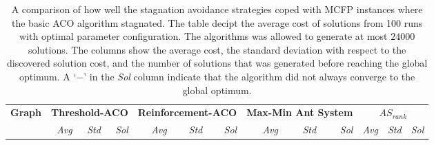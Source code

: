 \begin{sidewaystable}[p]
   \tiny
   \caption[Stagnation avoidance efficiency]{A comparison of how well the stagnation avoidance strategies coped with MCFP instances where the basic ACO algorithm stagnated. The table decipt the average cost of solutions from 100 runs with optimal parameter configuration. The algorithms was allowed to generate at most $24000$ solutions. The columns show the average cost, the standard deviation with respect to the discovered solution cost, and the number of solutions that was generated before reaching the global optimum. A `$-$' in the \emph{Sol} column indicate that the algorithm did not always converge to the global optimum.}
   \centering
   
   \begin{tabular}{lrrrrrrrrrrrr}
   \toprule
   
  \textbf{Graph} & \multicolumn{3}{c}{\textbf{Threshold\@{-}ACO}} & \multicolumn{3}{c}{\textbf{Reinforcement\@{-}ACO}} & \multicolumn{3}{c}{\textbf{Max\@{-}Min Ant System}} & \multicolumn{3}{c}{\textbf{$AS_{rank}$}}\\
  \cmidrule(lr){2-4}
  \cmidrule(lr){5-7}
  \cmidrule(lr){8-10}
  \cmidrule(lr){11-13}
  & \emph{Avg} & \emph{Std} & \emph{Sol} & \emph{Avg} & \emph{Std} & \emph{Sol} & \emph{Avg} & \emph{Std} & \emph{Sol} & \emph{Avg} & \emph{Std} & \emph{Sol}\\
  \cmidrule(lr){2-2}
  \cmidrule(lr){3-3}
  \cmidrule(lr){4-4}
  \cmidrule(lr){5-5}
  \cmidrule(lr){6-6}
  \cmidrule(lr){7-7}
  \cmidrule(lr){8-8}
  \cmidrule(lr){9-9}
  \cmidrule(lr){10-10}
  \cmidrule(lr){11-11}
  \cmidrule(lr){12-12}
  \cmidrule(lr){13-13}
  

\end{tabular}
\end{sidewaystable}
